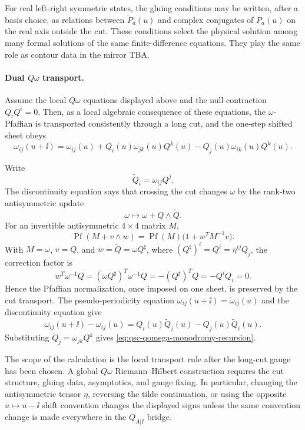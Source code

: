 For real left-right symmetric states, the gluing conditions may be written,
after a basis choice, as relations between \(\widetilde P_a(u)\) and complex
conjugates of \(P_a(u)\) on the real axis outside the cut.  These conditions
select the physical solution among many formal solutions of the same
finite-difference equations.  They play the same role as contour data in the
mirror TBA.

\paragraph{Dual \(Q\omega\) transport.}
Assume the local \(Q\omega\) equations displayed above and the null
contraction \(Q_iQ^i=0\).  Then, as a local algebraic consequence of these
equations, the \(\omega\)-Pfaffian is transported
consistently through a long cut, and the one-step shifted sheet obeys
\begin{equation}
  \omega_{ij}(u+\ii)
  =
  \omega_{ij}(u)
  +Q_i(u)\omega_{jk}(u)Q^k(u)
  -Q_j(u)\omega_{ik}(u)Q^k(u).
  \label{eq:qsc-qomega-monodromy-recursion}
\end{equation}

Write
\[
  \widetilde Q_i=\omega_{ij}Q^j .
\]
The discontinuity equation says that crossing the cut changes \(\omega\) by
the rank-two antisymmetric update
\[
  \omega\longmapsto \omega+Q\wedge\widetilde Q .
\]
For an invertible antisymmetric \(4\times4\) matrix \(M\),
\[
  \operatorname{Pf}(M+v\wedge w)
  =
  \operatorname{Pf}(M)\bigl(1+w^TM^{-1}v\bigr).
\]
With \(M=\omega\), \(v=Q\), and \(w=\widetilde Q=\omega Q^\sharp\),
where \((Q^\sharp)^i=Q^i=\eta^{ij}Q_j\), the correction factor is
\[
  w^T\omega^{-1}Q
  =
  (\omega Q^\sharp)^T\omega^{-1}Q
  =
  -(Q^\sharp)^TQ
  =
  -Q^iQ_i
  =
  0.
\]
Hence the Pfaffian normalization, once imposed on one sheet, is preserved by
the cut transport.  The pseudo-periodicity equation
\(\omega_{ij}(u+\ii)=\widetilde\omega_{ij}(u)\) and the discontinuity
equation give
\[
  \omega_{ij}(u+\ii)-\omega_{ij}(u)
  =
  Q_i(u)\widetilde Q_j(u)-Q_j(u)\widetilde Q_i(u).
\]
Substituting \(\widetilde Q_j=\omega_{jk}Q^k\) gives
\eqref{eq:qsc-qomega-monodromy-recursion}.

The scope of the calculation is the local transport rule after the long-cut
gauge has been chosen.  A global \(Q\omega\) Riemann--Hilbert construction
requires the cut structure, gluing data, asymptotics, and gauge fixing.  In
particular, changing the antisymmetric tensor \(\eta\), reversing the tilde
continuation, or using the opposite \(u\mapsto u-\ii\) shift convention changes
the displayed signs unless the same convention change is made everywhere in
the \(Q_{A|I}\) bridge.

